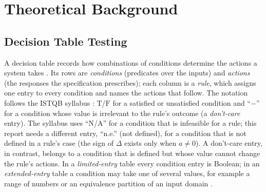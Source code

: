 \documentclass[11pt,a4paper]{article}
\begin{document}
\section{Theoretical Background}
\label{sec:background}

\subsection{Decision Table Testing}
\label{sec:bg-dt}

A decision table records how combinations of conditions determine the
actions a system takes \cite{jorgensen2021,copeland2004,istqb}. Its rows are
\emph{conditions} (predicates over the inputs) and \emph{actions} (the
responses the specification prescribes); each column is a \emph{rule}, which
assigns one entry to every condition and names the actions that follow. The
notation follows the ISTQB syllabus \cite[\S4.2.3]{istqb}:
\(\mathrm{T}\)/\(\mathrm{F}\) for a satisfied or unsatisfied condition and
``\(-\)'' for a condition whose value is irrelevant to the rule's outcome
(a \emph{don't-care} entry). The syllabus uses ``N/A'' for a condition that
is infeasible for a rule; this report needs a different entry, ``n.e.''
(not defined), for a condition that is not defined in a rule's case (the
sign of \(\Delta\) exists only when \(a\ne0\)). A don't-care entry, in
contrast, belongs to a condition that is defined but whose value cannot
change the rule's actions. In a \emph{limited-entry} table every condition entry is
Boolean; in an \emph{extended-entry} table a condition may take one of
several values, for example a range of numbers or an equivalence partition of
an input domain \cite[\S4.2.3]{istqb}.
\end{document}
